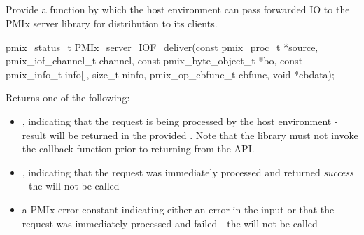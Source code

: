 \subsection{}

\summary

Provide a function by which the host environment can pass forwarded \ac{IO} to the \ac{PMIx} server library for distribution to its clients.

\format

\cspecificstart
\begin{codepar}
pmix_status_t
PMIx_server_IOF_deliver(const pmix_proc_t *source,
                        pmix_iof_channel_t channel,
                        const pmix_byte_object_t *bo,
                        const pmix_info_t info[], size_t ninfo,
                        pmix_op_cbfunc_t cbfunc, void *cbdata);
\end{codepar}
\cspecificend

\begin{arglist}
\end{arglist}

Returns one of the following:

\begin{itemize}
    \item {}, indicating that the request is being processed by the host environment - result will be returned in the provided . Note that the library must not invoke the callback function prior to returning from the \ac{API}.
    \item {}, indicating that the request was immediately processed and returned \textit{success} - the  will not be called
    \item a PMIx error constant indicating either an error in the input or that the request was immediately processed and failed - the  will not be called
\end{itemize}

